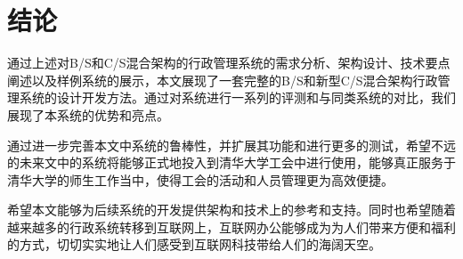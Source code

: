 
\chapter{结论}

通过上述对B/S和C/S混合架构的行政管理系统的需求分析、架构设计、技术要点阐述以及样例系统的展示，本文展现了一套完整的B/S和新型C/S混合架构行政管理系统的设计开发方法。通过对系统进行一系列的评测和与同类系统的对比，我们展现了本系统的优势和亮点。

通过进一步完善本文中系统的鲁棒性，并扩展其功能和进行更多的测试，希望不远的未来文中的系统将能够正式地投入到清华大学工会中进行使用，能够真正服务于清华大学的师生工作当中，使得工会的活动和人员管理更为高效便捷。

希望本文能够为后续系统的开发提供架构和技术上的参考和支持。同时也希望随着越来越多的行政系统转移到互联网上，互联网办公能够成为为人们带来方便和福利的方式，切切实实地让人们感受到互联网科技带给人们的海阔天空。
